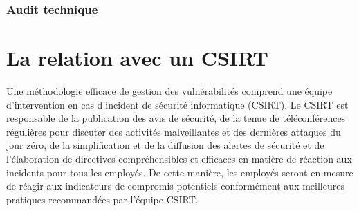 \subsubsection{Audit technique}




\section{La relation avec un CSIRT}

	Une méthodologie efficace de gestion des vulnérabilités comprend une équipe d’intervention en cas d’incident de sécurité informatique (CSIRT). Le CSIRT est responsable de la publication des avis de sécurité, de la tenue de téléconférences régulières pour discuter des activités malveillantes et des dernières attaques du jour zéro, de la simplification et de la diffusion des alertes de sécurité et de l’élaboration de directives compréhensibles et efficaces en matière de réaction aux incidents pour tous les employés. De cette manière, les employés seront en mesure de réagir aux indicateurs de compromis potentiels conformément aux meilleures pratiques recommandées par l'équipe CSIRT.




